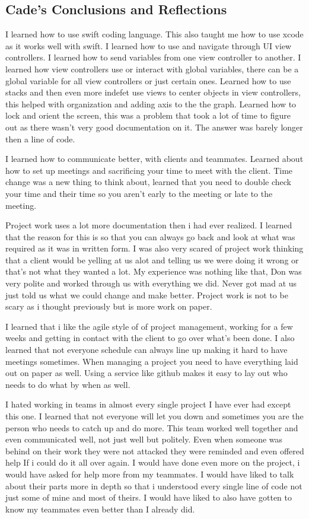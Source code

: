 \documentclass[onecolumn, draftclsnofoot,10pt, compsoc]{IEEEtran}
\begin{document}
\subsection{Cade's Conclusions and Reflections}
I learned how to use swift coding language. This also taught me how to use xcode as it works well with swift. I learned how to use and navigate through UI view controllers. I learned how to send variables from one view controller to another. I learned how view controllers use or interact with global variables, there can be a global variable for all view controllers or just certain ones. Learned how to use stacks and then even more indefet use views to center objects in view controllers, this helped with organization and adding axis to the the graph. Learned how to lock and orient the screen, this was a problem that took a lot of time to figure out as there wasn't very good documentation on it. The answer was barely longer then a line of code. 
    
I learned how to communicate better, with clients and teammates. Learned about how to set up meetings and sacrificing your time to meet with the client. Time change was a new thing to think about, learned that you need to double check your time and their time so you aren't early to the meeting or late to the meeting.  

    Project work uses a lot more documentation then i had ever realized. I learned that the reason for this is so that you can always go back and look at what was required as it was in written form. I was also very scared of project work thinking that a client would be yelling at us alot and telling us we were doing it wrong or that's not what they wanted a lot. My experience was nothing like that, Don was very polite and worked through us with everything we did. Never got mad at us just told us what we could change and make better. Project work is not to be scary as i thought previously but is more work on paper. 

    I learned that i like the agile style of of project management, working for a few weeks and getting in contact with the client to go over what's been done. I also learned that not everyone schedule can always line up making it hard to have meetings sometimes. When managing a project you need to have everything laid out on paper as well. Using a service like github makes it easy to lay out who needs to do what by when as well. 
    
    I hated working in teams in almost every single project I have ever had except this one. I learned that not everyone will let you down and sometimes you are the person who needs to catch up and do more. This team worked well together and even communicated well, not just well but politely. Even when someone was behind on their work they were not attacked they were reminded and even offered help 
    If i could do it all over again. I would have done even more on the project, i would have asked for help more from my teammates. I would have liked to talk about their parts more in depth so that i understood every single line of code not just some of mine and most of theirs. I would have liked to also have gotten to know my teammates even better than I already did. 
\end{document}
